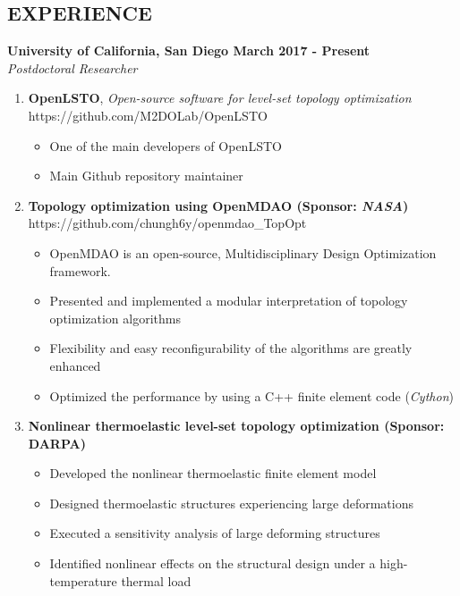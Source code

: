\documentclass[margin, 10pt]{res} %
\begin{document}
\begin{resume}
\section{EXPERIENCE} 

\textbf{University of California, San Diego \hfill March 2017 - Present} \\
\textit{Postdoctoral Researcher} \\ 
\begin{enumerate}
    \item \textbf{OpenLSTO}, \textit{Open-source software for level-set topology optimization} 
    \\ https://github.com/M2DOLab/OpenLSTO
    \begin{itemize}
        \item One of the main developers of OpenLSTO
        \item Main Github repository maintainer
    \end{itemize}
    
    \item \textbf{Topology optimization using OpenMDAO (Sponsor: \textit{NASA})} \\
    https://github.com/chungh6y/openmdao\_TopOpt
    \begin{itemize}
        \item OpenMDAO is an open-source, Multidisciplinary Design Optimization framework. 
        \item Presented and implemented a modular interpretation of topology optimization algorithms
        \item Flexibility and easy reconfigurability of the algorithms are greatly enhanced
        \item Optimized the performance by using a C++ finite element code (\textit{Cython})
    \end{itemize}
    
    \item \textbf{Nonlinear thermoelastic level-set topology optimization (Sponsor: DARPA)}
    \begin{itemize}
        \item Developed the nonlinear thermoelastic finite element model
        \item Designed thermoelastic structures experiencing large deformations
        \item Executed a sensitivity analysis of large deforming structures
        \item Identified nonlinear effects on the structural design under a high-temperature thermal load
    \end{itemize}
\end{enumerate}


\end{resume}
\end{document}
